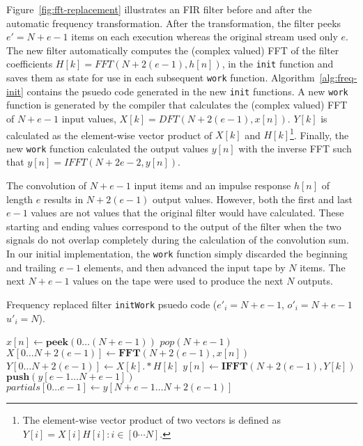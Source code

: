 Figure~\ref{fig:fft-replacement} illustrates an FIR filter before
and after the automatic frequency transformation.
After the transformation, the filter peeks $e'=N+e-1$ 
items on each execution whereas the original stream used only $e$.
The new filter automatically computes the (complex valued) FFT of the filter coefficients
$H[k]=FFT(N+2(e-1),h[n])$, in the {\tt init} function and saves them as state 
for use in each subsequent {\tt work} function. Algorithm~\ref{alg:freq-init}
contains the psuedo code generated in the new {\tt init} functions.
A new {\tt work} function is generated by the compiler that calculates the 
(complex valued) FFT of $N+e-1$ input values, $X[k]=DFT(N+2(e-1),x[n])$.
$Y[k]$ is calculated as the element-wise vector product 
of $X[k]$ and $H[k]$\footnote{The element-wise vector product of
two vectors is defined as $Y[i]=X[i]H[i]:i\in [0 \cdots N]$.}. 
Finally, the new {\tt work} function calculated the output values $y[n]$ with
the inverse FFT such that $y[n]=IFFT(N+2e-2,y[n])$.

The convolution of $N+e-1$ input items and an impulse response $h[n]$ of length $e$
results in $N+2(e-1)$ output values. However, both the first and last $e-1$ values 
are not values that the original filter would have calculated. These starting and
ending values correspond to the output of the filter when the two signals
do not overlap completely during the calculation of the convolution sum.
In our initial implementation, the {\tt work} function simply
discarded the beginning and trailing $e-1$ elements, and then advanced 
the input tape by $N$ items. The next $N+e-1$ values on the tape were 
used to produce the next $N$ outputs.

\begin{algorithm}
  \caption{Frequency replaced filter {\tt initWork} psuedo code 
  ($e'_{i}=N+e-1$, $o'_{i}=N+e-1$ $u'_{i}=N$).\label{alg:freq-init-work}}
  \begin{algorithmic}
    \STATE $x[n] \leftarrow \mathbf{peek}(0 \dots (N+e-1))$
    \STATE $pop(N+e-1)$
    \STATE $X[0 \dots N+2(e-1)] \leftarrow \mathbf{FFT} (N+2(e-1), x[n])$
    \STATE $Y[0 \dots N+2(e-1)] \leftarrow X[k] .* H[k]$
    \STATE $y[n] \leftarrow \mathbf{IFFT}(N+2(e-1), Y[k])$
    \STATE $\mathbf{push}(y[e-1 \dots N+e-1])$
    \STATE $partials[0 \dots e-1] \leftarrow y[N+e-1 \dots N+2(e-1)]$
  \end{algorithmic}
\end{algorithm}

